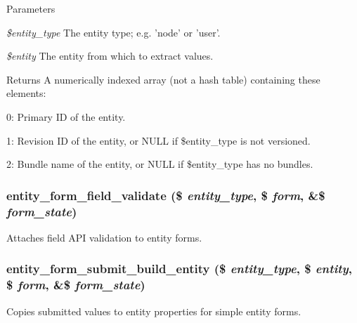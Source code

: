 \begin{DoxyParams}{Parameters}
\item[{\em \$entity\_\-type}]The entity type; e.g. 'node' or 'user'. \item[{\em \$entity}]The entity from which to extract values.\end{DoxyParams}
\begin{DoxyReturn}{Returns}
A numerically indexed array (not a hash table) containing these elements:
\begin{DoxyItemize}
\item 0: Primary ID of the entity.
\item 1: Revision ID of the entity, or NULL if \$entity\_\-type is not versioned.
\item 2: Bundle name of the entity, or NULL if \$entity\_\-type has no bundles. 
\end{DoxyItemize}
\end{DoxyReturn}
\hypertarget{common_8inc_a730911cdea4f78ea5c6995afdbd266f9}{
\subsubsection[{entity\_\-form\_\-field\_\-validate}]{\setlength{\rightskip}{0pt plus 5cm}entity\_\-form\_\-field\_\-validate (\$ {\em entity\_\-type}, \/  \$ {\em form}, \/  \&\$ {\em form\_\-state})}}
\label{common_8inc_a730911cdea4f78ea5c6995afdbd266f9}
Attaches field API validation to entity forms. \hypertarget{common_8inc_a0aac8c55307d5f8bca09e44481bcfc9a}{
\subsubsection[{entity\_\-form\_\-submit\_\-build\_\-entity}]{\setlength{\rightskip}{0pt plus 5cm}entity\_\-form\_\-submit\_\-build\_\-entity (\$ {\em entity\_\-type}, \/  \$ {\em entity}, \/  \$ {\em form}, \/  \&\$ {\em form\_\-state})}}
\label{common_8inc_a0aac8c55307d5f8bca09e44481bcfc9a}
Copies submitted values to entity properties for simple entity forms.

